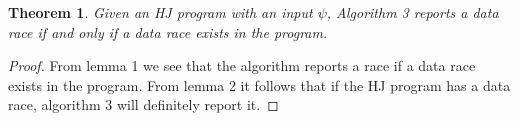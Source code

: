 \documentclass[10pt]{article}
\newtheorem{theorem}{Theorem}
\begin{document}
\begin{theorem}
Given an HJ program with an input $\psi$, Algorithm 3 reports a data race if and only if a data race exists in the program.
\end{theorem}
\begin{proof}
From lemma 1 we see that the algorithm reports a race if a data race exists in the program. From lemma 2 it follows that if the HJ program has a data race, algorithm 3 will definitely report it.

\end{proof}


  
\end{document}
